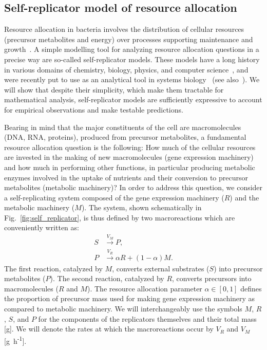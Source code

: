 \subsection{Self-replicator model of resource allocation}
\label{sec:model}

Resource allocation in bacteria involves the distribution of cellular resources (precursor metabolites and energy) over processes supporting maintenance and growth~\cite{schaechter_microbe_2006}.
A simple modelling tool for analyzing resource allocation questions in a precise way are so-called self-replicator models.
These models have a long history in various domains of chemistry, biology, physics, and computer science~\cite{sipper_fifty_1998}, and were recently put to use as an analytical tool in systems biology~\cite{molenaar_shifts_2009} (see also~\cite{flamm_minimal_2007}).
We will show that despite their simplicity, which make them tractable for mathematical analysis, self-replicator models are sufficiently expressive to account for empirical observations and make testable predictions.

Bearing in mind that the major constituents of the cell are macromolecules (DNA, RNA, proteins), produced from precursor metabolites, a fundamental resource allocation question is the following: How much of the cellular resources are invested in the making of new macromolecules (gene expression machinery) and how much in performing other functions, in particular producing metabolic enzymes involved in the uptake of nutrients and their conversion to precursor metabolites (metabolic machinery)?
In order to address this question, we consider a self-replicating system composed of the gene expression machinery ($R$) and the metabolic machinery ($M$).
The system, shown schematically in Fig.~\ref{fig:self_replicator}, is thus defined by two macroreactions which are conveniently written as:
\begin{equation}\label{eq:reactions}
\begin{aligned}
S &\overset{V_M}{\longrightarrow} P, \\
P &\overset{V_R}{\longrightarrow} \alpha R + (1-\alpha) M.
\end{aligned}
\end{equation}
The first reaction, catalyzed by $M$, converts external substrates ($S$) into precursor metabolites ($P$).
The second reaction, catalyzed by $R$, converts precursors into macromolecules ($R$ and $M$).
The resource allocation parameter $\alpha \in [0,1]$ defines the proportion of precursor mass used for making gene expression machinery as compared to metabolic machinery.
We will interchangeably use the symbols $M$, $R$, $S$, and $P$ for the components of the replicators themselves and their total mass [g].
We will denote the rates at which the macroreactions occur by $V_R$ and $V_M$ [g~h\textsuperscript{-1}].

